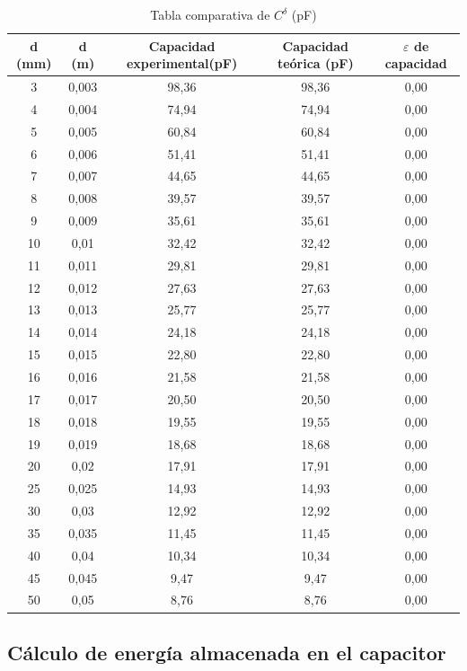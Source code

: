 \documentclass{article}
\begin{document}
   \begin{table}[H]
   \centering
   \begin{adjustbox}{max width=\columnwidth}
   \begin{tabular}{|c|c|c|c|c|}
    	\hline
        d (mm) & d (m) & Capacidad experimental(pF) & Capacidad teórica (pF) & $\varepsilon$ de capacidad \\ \hline
3	&0,003	&98,36	& 98,36    	&0,00\\
4	&0,004	&74,94	& 74,94    	&0,00\\
5	&0,005	&60,84	& 60,84    	&0,00\\
6	&0,006	&51,41	& 51,41    	&0,00\\
7	&0,007	&44,65	& 44,65    	&0,00\\
8	&0,008	&39,57	& 39,57    	&0,00\\
9	&0,009	&35,61	& 35,61    	&0,00\\
10	&0,01	&32,42	& 32,42    	&0,00\\
11	&0,011	&29,81	& 29,81    	&0,00\\
12	&0,012	&27,63	& 27,63    	&0,00\\
13	&0,013	&25,77	& 25,77    	&0,00\\
14	&0,014	&24,18	& 24,18    	&0,00\\
15	&0,015	&22,80	& 22,80    	&0,00\\
16	&0,016	&21,58	& 21,58    	&0,00\\
17	&0,017	&20,50	& 20,50    	&0,00\\
18	&0,018	&19,55	& 19,55    	&0,00\\
19	&0,019	&18,68	& 18,68    	&0,00\\
20	&0,02	&17,91	& 17,91    	&0,00\\
25	&0,025	&14,93	& 14,93    	&0,00\\
30	&0,03	&12,92	& 12,92    	&0,00\\
35	&0,035	&11,45	& 11,45    	&0,00\\
40	&0,04	&10,34	& 10,34    	&0,00\\
45	&0,045	&9,47	& 9,47    	&0,00\\
50	&0,05	&8,76	& 8,76    	&0,00\\
    \hline
	\end{tabular}
	\end{adjustbox}
	\caption{Tabla comparativa de $C^{\delta}$ (pF)}
    \end{table}




    
\subsection{Cálculo de energía almacenada en el capacitor}
\end{document}
